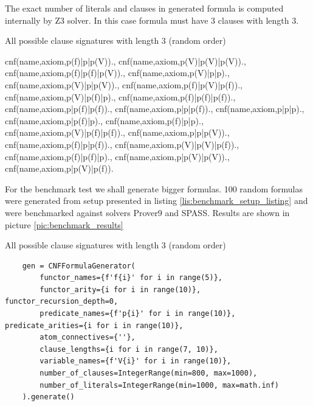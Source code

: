 The exact number of literals and clauses in generated formula is computed internally by Z3 solver. In this case formula must have 3 clauses with length 3.

\begin{listing}[H]
  \caption{All possible clause signatures with length 3 (random order)}
\begin{tptpcode}
{cnf(name,axiom,p(f)|p|p(V)).,    cnf(name,axiom,p(V)|p(V)|p(V)).,
 cnf(name,axiom,p(f)|p(f)|p(V))., cnf(name,axiom,p(V)|p|p).,
 cnf(name,axiom,p(V)|p|p(V)).,    cnf(name,axiom,p(f)|p(V)|p(f)).,
 cnf(name,axiom,p(V)|p(f)|p).,    cnf(name,axiom,p(f)|p(f)|p(f)).,
 cnf(name,axiom,p|p(f)|p(f)).,    cnf(name,axiom,p|p|p(f)).,
 cnf(name,axiom,p|p|p).,          cnf(name,axiom,p|p(f)|p).,
 cnf(name,axiom,p(f)|p|p).,       cnf(name,axiom,p(V)|p(f)|p(f)).,
 cnf(name,axiom,p|p|p(V)).,       cnf(name,axiom,p(f)|p|p(f)).,
 cnf(name,axiom,p(V)|p(V)|p(f))., cnf(name,axiom,p(f)|p(f)|p).,
 cnf(name,axiom,p|p(V)|p(V)).,    cnf(name,axiom,p|p(V)|p(f)).}
\end{tptpcode}
\end{listing}

For the benchmark test we shall generate bigger formulas.
100 random formulas were generated from setup presented in listing \ref{lis:benchmark_setup_listing} and were benchmarked against solvers Prover9 and SPASS. Results are shown in picture \ref{pic:benchmark_results}

\begin{listing}[H]
  \caption{All possible clause signatures with length 3 (random order)}
  \label{lis:benchmark_setup_listing}
\begin{verbatim}
    gen = CNFFormulaGenerator(
        functor_names={f'f{i}' for i in range(5)},
        functor_arity={i for i in range(10)}, functor_recursion_depth=0,
        predicate_names={f'p{i}' for i in range(10)}, predicate_arities={i for i in range(10)},
        atom_connectives={''},
        clause_lengths={i for i in range(7, 10)},
        variable_names={f'V{i}' for i in range(10)},
        number_of_clauses=IntegerRange(min=800, max=1000),
        number_of_literals=IntegerRange(min=1000, max=math.inf)
    ).generate()
\end{verbatim}
\end{listing}

